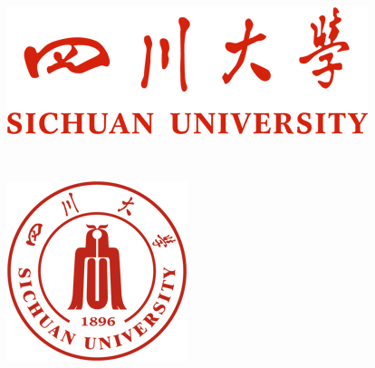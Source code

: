 \documentclass[a4paper,12pt]{book}
\begin{document}
    \begin{titlepage}
        \begin{center}
            \includegraphics[scale=0.5]{image/SCU.png}\\
            

            \vspace{1.5cm}

            \textbf{}\\

            \vspace{1cm}

            \includegraphics[scale=0.5]{image/SCU_logo.png}\\

            \vspace{2cm}


\end{center}
\end{titlepage}
\end{document}
